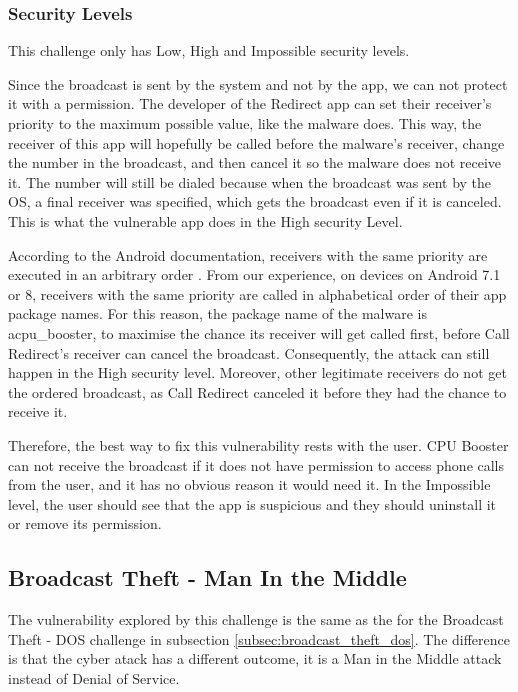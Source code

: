     \subsubsection{Security Levels}
        \label{subsubsec:broadcast_theft_dos_security_levels}
        
    This challenge only has Low, High and Impossible security levels.
        
    Since the broadcast is sent by the system and not by the app, we can not protect it with a permission. The developer of the Redirect app can set their receiver's priority to the maximum possible value, like the malware does. This way, the receiver of this app will hopefully be called before the malware's receiver, change the number in the broadcast, and then cancel it so the malware does not receive it. The number will still be dialed because when the broadcast was sent by the OS, a final receiver was specified, which gets the broadcast even if it is canceled. This is what the vulnerable app does in the High security Level.

    According to the Android documentation, receivers with the same priority are executed in an arbitrary order \cite{broadcasts_overview}. From our experience, on devices on Android 7.1 or 8, receivers with the same priority are called in alphabetical order of their app package names. For this reason, the package name of the malware is acpu\_booster, to maximise the chance its receiver will get called first, before Call Redirect's receiver can cancel the broadcast. Consequently, the attack can still happen in the High security level. Moreover, other legitimate receivers do not get the ordered broadcast, as Call Redirect canceled it before they had the chance to receive it.

    Therefore, the best way to fix this vulnerability rests with the user. CPU Booster can not receive the broadcast if it does not have permission to access phone calls from the user, and it has no obvious reason it would need it. In the Impossible level, the user should see that the app is suspicious and they should uninstall it or remove its permission. 
    
    \subsection{Broadcast Theft - Man In the Middle}
        \label{subsec:broadcast_theft_mitm}
        
    The vulnerability explored by this challenge is the same as the for the Broadcast Theft - DOS challenge in subsection \ref{subsec:broadcast_theft_dos}. The difference is that the cyber atack has a different outcome, it is a Man in the Middle attack instead of Denial of Service.
    
